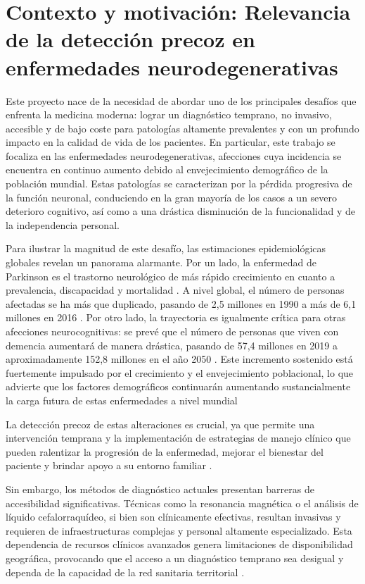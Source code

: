 \section{Contexto y motivación: Relevancia de la detección precoz en enfermedades neurodegenerativas}

Este proyecto nace de la necesidad de abordar uno de los principales desafíos que enfrenta la medicina moderna: lograr un diagnóstico temprano, no invasivo, accesible y de bajo coste para patologías altamente prevalentes y con un profundo impacto en la calidad de vida de los pacientes. En particular, este trabajo se focaliza en las enfermedades neurodegenerativas, afecciones cuya incidencia se encuentra en continuo aumento debido al envejecimiento demográfico de la población mundial. Estas patologías se caracterizan por la pérdida progresiva de la función neuronal, conduciendo en la gran mayoría de los casos a un severo deterioro cognitivo, así como a una drástica disminución de la funcionalidad y de la independencia personal.

Para ilustrar la magnitud de este desafío, las estimaciones epidemiológicas globales revelan un panorama alarmante. Por un lado, la enfermedad de Parkinson es el trastorno neurológico de más rápido crecimiento en cuanto a prevalencia, discapacidad y mortalidad \cite{gbd2018parkinson}. A nivel global, el número de personas afectadas se ha más que duplicado, pasando de 2,5 millones en 1990 a más de 6,1 millones en 2016 \cite{gbd2018parkinson}. Por otro lado, la trayectoria es igualmente crítica para otras afecciones neurocognitivas: se prevé que el número de personas que viven con demencia aumentará de manera drástica, pasando de 57,4 millones en 2019 a aproximadamente 152,8 millones en el año 2050 \cite{gbd2022dementia}. Este incremento sostenido está fuertemente impulsado por el crecimiento y el envejecimiento poblacional, lo que advierte que los factores demográficos continuarán aumentando sustancialmente la carga futura de estas enfermedades a nivel mundial \cite{gbd2018parkinson, gbd2022dementia}

La detección precoz de estas alteraciones es crucial, ya que permite una intervención temprana y la implementación de estrategias de manejo clínico que pueden ralentizar la progresión de la enfermedad, mejorar el bienestar del paciente y brindar apoyo a su entorno familiar \cite{abrilcarreres2024}.

Sin embargo, los métodos de diagnóstico actuales presentan barreras de accesibilidad significativas. Técnicas como la resonancia magnética o el análisis de líquido cefalorraquídeo, si bien son clínicamente efectivas, resultan invasivas y requieren de infraestructuras complejas y personal altamente especializado. Esta dependencia de recursos clínicos avanzados genera limitaciones de disponibilidad geográfica, provocando que el acceso a un diagnóstico temprano sea desigual y dependa de la capacidad de la red sanitaria territorial \cite{avance2023}.


